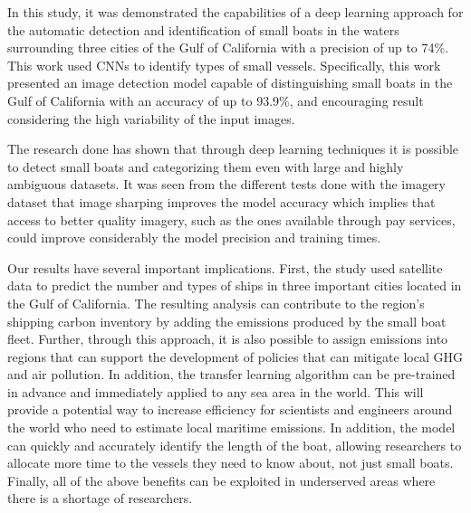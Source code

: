 
In this study, it was demonstrated the capabilities of a deep learning approach for the automatic detection and identification of small boats in the waters surrounding three cities of the Gulf of California  with a precision of up to 74\%. This work used CNNs to identify types of small vessels. Specifically, this work presented an image detection model capable of distinguishing small boats in the Gulf of California with an accuracy of up to 93.9\%, and encouraging result considering the high variability of the input images.

The research done has shown that through deep learning techniques it is possible to detect small boats and categorizing them even with large and highly ambiguous datasets. It was seen from the different tests done with the imagery dataset that image sharping improves the model accuracy which implies that access to better quality imagery, such as the ones available through pay services, could improve considerably the model precision and training times.


Our results have several important implications. First, the study used satellite data to predict the number and types of ships in three important cities located in the Gulf of California. The resulting analysis can contribute to the region's shipping carbon inventory by adding the emissions produced by the small boat fleet. Further, through this approach, it is also possible to assign emissions into regions that can support the development of policies that can mitigate local GHG and air pollution. In addition, the transfer learning algorithm can be pre-trained in advance and immediately applied to any sea area in the world. This will provide a potential way to increase efficiency for scientists and engineers around the world who need to estimate local maritime emissions. In addition, the model can quickly and accurately identify the length of the boat, allowing researchers to allocate more time to the vessels they need to know about, not just small boats. Finally, all of the above benefits can be exploited in underserved areas where there is a shortage of researchers.

